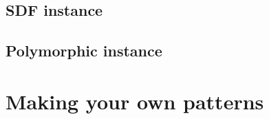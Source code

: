 \documentclass{article}
\begin{document}
\subsection{SDF instance}
\label{sec:sdf-instance}


\subsection{Polymorphic instance}
\label{sec:poly-instance}


\section{Making your own patterns}
\label{sec:making-your-own}




\printbibliography
\end{document}
